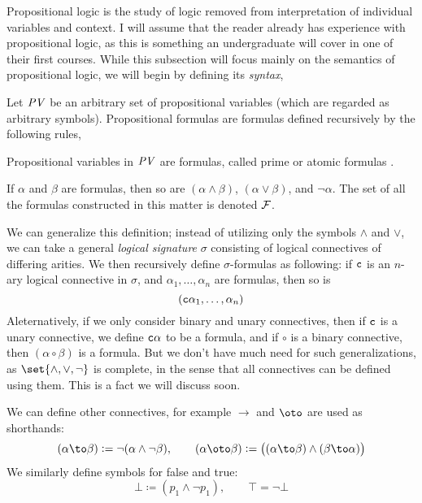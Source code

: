 Propositional logic is the study of logic removed from interpretation of individual variables and context.
I will assume that the reader already has experience with propositional logic, as this is something an undergraduate will cover in one of their first courses.
While this subsection will focus mainly on the semantics of propositional logic, we will begin by defining its {\it syntax},

\def\PV{{\it PV}}
\def\mF{{\cal F}}
\bdefn

    Let $\PV$ be an arbitrary set of {\emphcolor propositional variables} (which are regarded as arbitrary symbols).
    {\emphcolor Propositional formulas} are formulas defined recursively by the following rules,
    \benum
        \item Propositional variables in $\PV$ are formulas, called {\emphcolor prime} or {\emphcolor atomic} formulas%
        .
        \item If $\alpha$ and $\beta$ are formulas, then so are $(\alpha\land\beta)$, $(\alpha\lor\beta)$, and $\neg\alpha$.
    \eenum
    The set of all the formulas constructed in this matter is denoted $\mF$.

\edefn

We can generalize this definition; instead of utilizing only the symbols $\land$ and $\lor$, we can take a general {\it logical signature} $\sigma$ consisting of logical connectives of differing arities.
We then recursively define $\sigma$-formulas as following: if ${\tt c}$ is an $n$-ary logical connective in $\sigma$, and $\alpha_1,\dots,\alpha_n$ are formulas, then so is
$$ ({\tt c}\alpha_1,\dots,\alpha_n) $$
Aleternatively, if we only consider binary and unary connectives, then if ${\tt c}$ is a unary connective, we define ${\tt c}\alpha$ to be a formula, and if $\circ$ is a binary connective, then
$(\alpha\circ\beta)$ is a formula.
But we don't have much need for such generalizations, as $\set{\land, \lor, \neg}$ is complete, in the sense that all connectives can be defined using them.
This is a fact we will discuss soon.

We can define other connectives, for example $\to$ and $\oto$ are used as shorthands:
$$ (\alpha\to\beta) \coloneqq \neg(\alpha\land\neg\beta),\qquad (\alpha\oto\beta) \coloneqq \bigl((\alpha\to\beta)\land(\beta\to\alpha)\bigr) $$
We similarly define symbols for false and true:
$$ \bot \coloneqq (p_1\land\neg p_1),\qquad \top = \neg\bot $$

